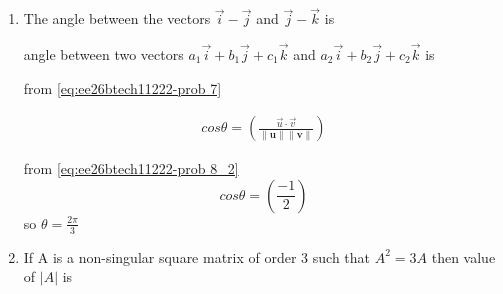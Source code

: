 \begin{enumerate}[label=\thesubsection.\arabic*, ref=\thesubsection.\theenumi]
\begin{enumerate}
	\item symmetric and transitive ,but not reflexive 
	\item reflexive and symmetric ,but not transitive 
	\item symmetric ,but neither reflexive nor transitive 
	\item an equivalence relation 
\end{enumerate}

\solution
 Relation $R$ is not reflexive ,since $(2,2),(3,3) \notin R$
 
 Relation $R$ is not transitive $(2,1) \epsilon R ,(1,2) \epsilon R  $ but $(2,2) \notin R$
 
R is symmetric.
 
 
   
\item 

The angle between the vectors $\vec{i}-\vec{j}$ and $\vec{j}-\vec{k}$ is
\begin{enumerate}
\end{enumerate}

\solution 

angle between two vectors $a_1\vec{i} + b_1\vec{j} +c_1\vec{k} $ and $a_2\vec{i} +b_2\vec{j} +c_2\vec{k}$ is 

from \eqref{eq:ee26btech11222-prob 7}

\begin{align}
	cos\theta = \left( \frac{\vec{u}\cdot \vec{v}}{\|\mathbf{u}\|\|\mathbf{v}\|}\right)
\end{align}

from \eqref{eq:ee26btech11222-prob 8_2}
$$cos\theta = \left( \frac{-1}{2}\right)$$ so $\theta =\frac{2\pi}{3}$

\item 

If A is a non-singular square matrix of order 3 such that $A^{2}=3A$ then value of $\vert{A}\vert{}$ is
\begin{enumerate}
\end{enumerate}
\end{enumerate}

